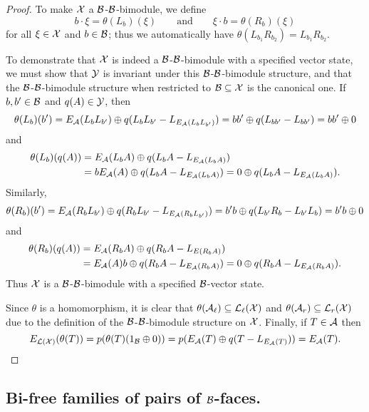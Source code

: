 \begin{proof}
	To make $\mathcal{X}$ a $\mathcal{B}$-$\mathcal{B}$-bimodule, we define
	\[
		b \cdot \xi = \theta(L_b)(\xi) \qquad \text{and}\qquad \xi \cdot b = \theta(R_b)(\xi)
	\]
	for all $\xi \in \mathcal{X}$ and $b \in \mathcal{B}$; thus we automatically have $\theta(L_{b_1}R_{b_2}) = L_{b_1}R_{b_2}$.


	To demonstrate that $\mathcal{X}$ is indeed a $\mathcal{B}$-$\mathcal{B}$-bimodule with a specified vector state, we must show that $\mathcal{Y}$ is invariant under this $\mathcal{B}$-$\mathcal{B}$-bimodule structure, and that the $\mathcal{B}$-$\mathcal{B}$-bimodule structure when restricted to $\mathcal{B} \subseteq \mathcal{X}$ is the canonical one.
	If $b, b' \in \mathcal{B}$ and $q(A) \in \mathcal{Y}$, then
	\[
		\theta(L_b)(b') = E_{\mathcal{A}}(L_b L_{b'}) \oplus q(L_b L_{b'} - L_{E_{\mathcal{A}}(L_b L_{b'})}) = bb' \oplus q(L_{bb'} - L_{bb'}) = bb' \oplus 0
	\]
	and
	\begin{align*}
		\theta(L_b)(q(A)) &= E_{\mathcal{A}}(L_b A) \oplus q(L_b A - L_{E_{\mathcal{A}}(L_b A)})\\
		&= bE_{\mathcal{A}}(A) \oplus q(L_b A - L_{E_{\mathcal{A}}(L_b A)}) = 0 \oplus q(L_b A - L_{E_{\mathcal{A}}(L_b A)}).
	\end{align*}
	Similarly,
	\[
		\theta(R_b)(b') = E_{\mathcal{A}}(R_b L_{b'}) \oplus q(R_b L_{b'} - L_{E_{\mathcal{A}}(R_b L_{b'})}) = b'b \oplus q(L_{b'}R_b - L_{b'}L_{b}) = b'b \oplus 0
	\]
	and
	\begin{align*}
		\theta(R_b)(q(A)) &= E_{\mathcal{A}}(R_b A) \oplus q(R_b A - L_{E(R_b A)})\\
		&= E_{\mathcal{A}}(A)b \oplus q(R_b A - L_{E_{\mathcal{A}}(R_b A)}) = 0 \oplus q(R_b A - L_{E_{\mathcal{A}}(R_b A)}).
	\end{align*}
	Thus $\mathcal{X}$ is a $\mathcal{B}$-$\mathcal{B}$-bimodule with a specified $\mathcal{B}$-vector state.

	Since $\theta$ is a homomorphism, it is clear that $\theta(\mathcal{A}_\ell) \subseteq \mathcal{L}_\ell(\mathcal{X})$ and $\theta(\mathcal{A}_r) \subseteq \mathcal{L}_r(\mathcal{X})$ due to the definition of the $\mathcal{B}$-$\mathcal{B}$-bimodule structure on $\mathcal{X}$.
	Finally, if $T \in \mathcal{A}$ then
	\[
		E_{\mathcal{L}(\mathcal{X})}(\theta(T)) = p(\theta(T) (1_{\mathcal{B}} \oplus 0)) = p(E_{\mathcal{A}}(T) \oplus q(T - L_{E_{\mathcal{A}}(T)})) = E_{\mathcal{A}}(T).\qedhere
	\]
\end{proof}








\subsection{Bi-free families of pairs of $\mathcal{B}$-faces.}


